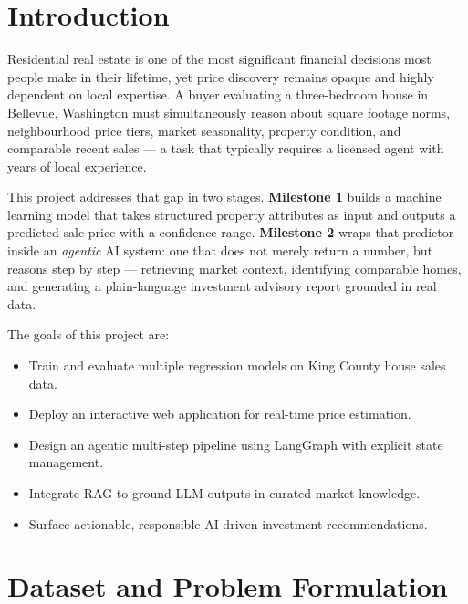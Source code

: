 \documentclass[12pt, a4paper]{article}
\begin{document}
\tableofcontents
\newpage

\section{Introduction}

Residential real estate is one of the most significant financial decisions most
people make in their lifetime, yet price discovery remains opaque and highly dependent
on local expertise. A buyer evaluating a three-bedroom house in Bellevue, Washington
must simultaneously reason about square footage norms, neighbourhood price tiers,
market seasonality, property condition, and comparable recent sales --- a task that
typically requires a licensed agent with years of local experience.

This project addresses that gap in two stages. \textbf{Milestone 1} builds a
machine learning model that takes structured property attributes as input and
outputs a predicted sale price with a confidence range. \textbf{Milestone 2} wraps
that predictor inside an \textit{agentic} AI system: one that does not merely return
a number, but reasons step by step --- retrieving market context, identifying
comparable homes, and generating a plain-language investment advisory report grounded
in real data.

The goals of this project are:
\begin{itemize}[leftmargin=1.4em]
  \item Train and evaluate multiple regression models on King County house sales data.
  \item Deploy an interactive web application for real-time price estimation.
  \item Design an agentic multi-step pipeline using LangGraph with explicit state management.
  \item Integrate RAG to ground LLM outputs in curated market knowledge.
  \item Surface actionable, responsible AI-driven investment recommendations.
\end{itemize}

\section{Dataset and Problem Formulation}
\end{document}
